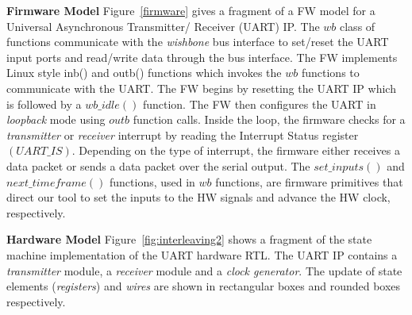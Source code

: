\documentclass[sigconf]{acmart}
\begin{document}
\textbf{Firmware Model} Figure~\ref{firmware} gives a fragment of a FW model for a Universal 
Asynchronous Transmitter/ Receiver (UART) IP.  The
$wb$ class of functions communicate with the {\em wishbone} bus interface to
set/reset the UART input ports and read/write data through the bus
interface.  The FW implements Linux style inb() and outb() functions which
invokes the $wb$ functions to communicate with the UART.  The FW begins 
by resetting the UART IP which is followed by a $wb\_idle()$ function.  The 
FW then configures the UART in {\em loopback} mode using $outb$ function calls. 
Inside the loop, the firmware checks for a {\em transmitter} or {\em
receiver} interrupt by reading the Interrupt Status register $(UART\_IS)$. 
Depending on the type of interrupt, the firmware either receives a data packet 
or sends a data packet over the serial output.  The $set\_inputs()$ and
$next\_timeframe()$ functions, used in $wb$ functions, are 
firmware primitives that direct our tool to set the inputs to the HW signals 
and advance the HW clock, respectively.

\textbf{Hardware Model} Figure~\ref{fig:interleaving2} shows a fragment of the state machine 
implementation of the UART hardware RTL.  The UART IP contains a
\emph{transmitter} module, a \emph{receiver} module and a \emph{clock
generator}.  The update of state elements (\emph{registers}) and 
\emph{wires} are shown in rectangular boxes and rounded boxes respectively.  
\end{document}
